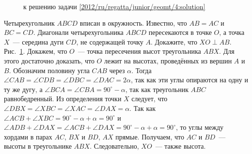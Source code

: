 \ifsolution
\begin{figure}\centering
    \caption{к решению задачи \ref{2012/ru/regatta/junior/geomt/4:solution}}
    \label{2012/ru/regatta/junior/geomt/4:solution:fig}
\end{figure}%
\fi %

\problem
Четырехугольник $ABCD$ вписан в окружность.
Известно, что $AB = AC$ и $BC = CD$.
Диагонали четырехугольника $ABCD$ пересекаются в точке $O$, а точка $X$~---
середина дуги $CD$, не содержащей точку $A$. Докажите, что $XO \perp AB$.
\solution
\label{2012/ru/regatta/junior/geomt/4:solution}%
Рис.~\ref{2012/ru/regatta/junior/geomt/4:solution:fig}.
Докажем, что $O$~--- точка пересечения высот треугольника $ABX$.
Для этого достаточно доказать, что $O$ лежит на высотах, проведённых из вершин
$A$ и $B$.
Обозначим половину угла $CAB$ через $\alpha$.
Тогда
$\angle CAB = \angle CDB = \angle DBC = \angle DAC = 2 \alpha$,
так как эти углы опираются на одну и ту же дугу, а
$\angle BCA = \angle CBA = 90^\circ - \alpha$,
так как треугольник $ABC$ равнобедренный.
Из определения точки $X$ следует, что
$\angle DBX = \angle XBC = \angle XAC = \angle DAX = \alpha$.
Так как
\(
    \angle ACB + \angle XBC
=
    90^\circ - \alpha + \alpha
=
    90^\circ
\)
и
\(
    \angle ADB + \angle DAX
=
    \angle ACB + \angle DAX
=
    90^\circ - \alpha + \alpha
=
    90^\circ
\),
то углы между хордами в парах $AC$, $BX$ и $BD$, $AX$ прямые.
Получаем, что $AC$ и $BD$~--- высоты в треугольнике $ABX$.
Следовательно, $XO$~--- также высота.
\endproblem

